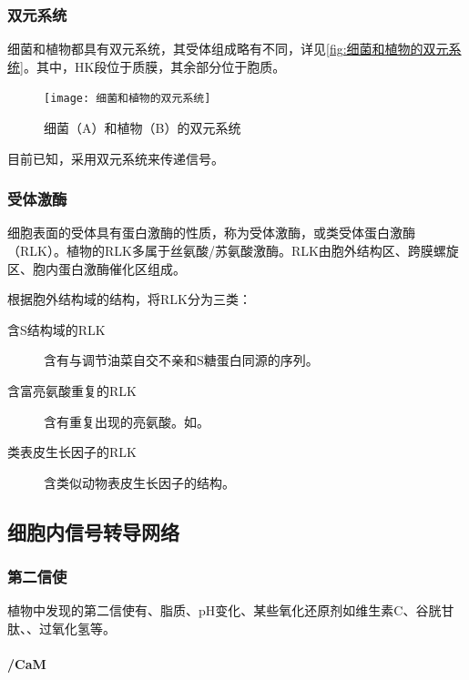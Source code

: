 \subsubsection{双元系统}

细菌和植物都具有双元系统，其受体组成略有不同，详见\autoref{fig:细菌和植物的双元系统}。其中，HK段位于质膜，其余部分位于胞质。

\begin{figure}[htbp]
	\centering
	\texttt{[image: 细菌和植物的双元系统]}
	\caption{细菌（A）和植物（B）的双元系统}
	\label{fig:细菌和植物的双元系统}
\end{figure}

目前已知，采用双元系统来传递信号。

\subsubsection{受体激酶}

细胞表面的受体具有蛋白激酶的性质，称为受体激酶，或类受体蛋白激酶（RLK）。植物的RLK多属于丝氨酸/苏氨酸激酶。RLK由胞外结构区、跨膜螺旋区、胞内蛋白激酶催化区组成。

根据胞外结构域的结构，将RLK分为三类：

\begin{description}
	\item[含S结构域的RLK] 含有与调节油菜自交不亲和S糖蛋白同源的序列。
	\item[含富亮氨酸重复的RLK] 含有重复出现的亮氨酸。如。
	\item[类表皮生长因子的RLK] 含类似动物表皮生长因子的结构。
\end{description}

\subsection{细胞内信号转导网络}

\subsubsection{第二信使}

植物中发现的第二信使有、脂质、pH变化、某些氧化还原剂如维生素C、谷胱甘肽、、过氧化氢等。

\paragraph{/CaM}

